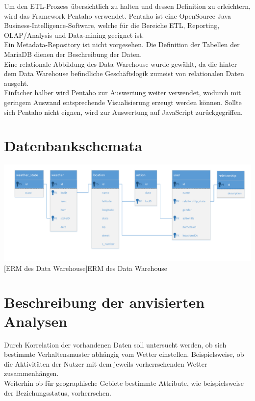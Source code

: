 \documentclass[a4paper,12pt]{scrartcl}
\makeatletter
\def\ScaleIfNeeded{%
\ifdim\Gin@nat@width>\linewidth
\linewidth
\else
\Gin@nat@width
\fi
}
\makeatother
\begin{document}
Um den ETL-Prozess übersichtlich zu halten und dessen Definition zu erleichtern, wird das Framework Pentaho verwendet. Pentaho ist eine OpenSource Java Business-Intelligence-Software, welche für die Bereiche ETL, Reporting, OLAP/Analysis und Data-mining geeignet ist.\\

Ein Metadata-Repository ist nicht vorgesehen. Die Definition der Tabellen der MariaDB dienen der Beschreibung der Daten.\\
Eine relationale Abbildung des Data Warehouse wurde gewählt, da die hinter dem Data Warehouse befindliche Geschäftslogik zumeist von relationalen Daten ausgeht.\\

Einfacher halber wird Pentaho zur Auswertung weiter verwendet, wodurch mit geringem Auswand entsprechende Visualisierung erzeugt werden können. Sollte sich Pentaho nicht eignen, wird zur Auswertung auf JavaScript zurückgegriffen.


\section{Datenbankschemata}



\begin{center}
\centering
\includegraphics[width=\ScaleIfNeeded]{../Data_Warehouse_ERM.pdf}%
[ERM des Data Warehouse]{ERM des Data Warehouse}%
\end{center}




\section{Beschreibung der anvisierten Analysen}

Durch Korrelation der vorhandenen Daten soll untersucht werden, ob sich bestimmte Verhaltensmuster abhängig vom Wetter einstellen. Beispielsweise, ob die Aktivitäten der Nutzer mit dem jeweils vorherrschenden Wetter zusammenhängen.\\
Weiterhin ob für geographische Gebiete bestimmte Attribute, wie beispielsweise der Beziehungsstatus, vorherrschen.
\end{document}
